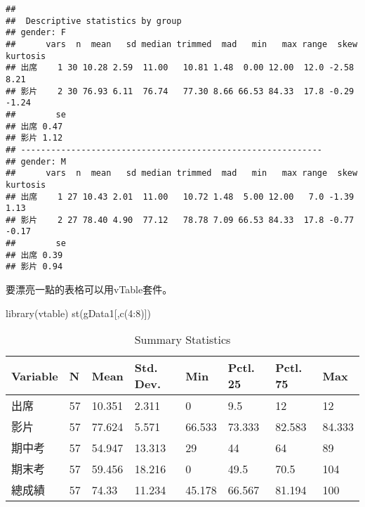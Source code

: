 \documentclass[
]{book}
\newenvironment{Shaded}{\begin{snugshade}}{\end{snugshade}}
\newcommand{\AttributeTok}[1]{\textcolor[rgb]{0.77,0.63,0.00}{#1}}
\newcommand{\DecValTok}[1]{\textcolor[rgb]{0.00,0.00,0.81}{#1}}
\newcommand{\FunctionTok}[1]{\textcolor[rgb]{0.00,0.00,0.00}{#1}}
\newcommand{\NormalTok}[1]{#1}
\newcommand{\SpecialCharTok}[1]{\textcolor[rgb]{0.00,0.00,0.00}{#1}}
\begin{document}
\begin{Shaded}
\end{Shaded}

\begin{verbatim}
## 
##  Descriptive statistics by group 
## gender: F
##      vars  n  mean   sd median trimmed  mad   min   max range  skew kurtosis
## 出席    1 30 10.28 2.59  11.00   10.81 1.48  0.00 12.00  12.0 -2.58     8.21
## 影片    2 30 76.93 6.11  76.74   77.30 8.66 66.53 84.33  17.8 -0.29    -1.24
##        se
## 出席 0.47
## 影片 1.12
## ------------------------------------------------------------ 
## gender: M
##      vars  n  mean   sd median trimmed  mad   min   max range  skew kurtosis
## 出席    1 27 10.43 2.01  11.00   10.72 1.48  5.00 12.00   7.0 -1.39     1.13
## 影片    2 27 78.40 4.90  77.12   78.78 7.09 66.53 84.33  17.8 -0.77    -0.17
##        se
## 出席 0.39
## 影片 0.94
\end{verbatim}

要漂亮一點的表格可以用vTable套件。

\begin{Shaded}
\begin{Highlighting}[]
\FunctionTok{library}\NormalTok{(vtable)}
\FunctionTok{st}\NormalTok{(gData1[,}\FunctionTok{c}\NormalTok{(}\DecValTok{4}\SpecialCharTok{:}\DecValTok{8}\NormalTok{)])}
\end{Highlighting}
\end{Shaded}

\begin{table}

\caption{\label{tab:unnamed-chunk-36}Summary Statistics}
\centering
\begin{tabular}[t]{llllllll}
\toprule
Variable & N & Mean & Std. Dev. & Min & Pctl. 25 & Pctl. 75 & Max\\
\midrule
出席 & 57 & 10.351 & 2.311 & 0 & 9.5 & 12 & 12\\
影片 & 57 & 77.624 & 5.571 & 66.533 & 73.333 & 82.583 & 84.333\\
期中考 & 57 & 54.947 & 13.313 & 29 & 44 & 64 & 89\\
期末考 & 57 & 59.456 & 18.216 & 0 & 49.5 & 70.5 & 104\\
總成績 & 57 & 74.33 & 11.234 & 45.178 & 66.567 & 81.194 & 100\\
\bottomrule
\end{tabular}
\end{table}
\end{document}
